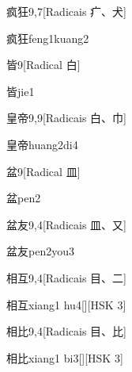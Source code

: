 \begin{entry}{疯狂}{9,7}[Radicais ⽧、⽝]
  \begin{phonetics}{疯狂}{feng1kuang2}
  \end{phonetics}
\end{entry}

\begin{entry}{皆}{9}[Radical ⽩]
  \begin{phonetics}{皆}{jie1}
  \end{phonetics}
\end{entry}

\begin{entry}{皇帝}{9,9}[Radicais ⽩、⼱]
  \begin{phonetics}{皇帝}{huang2di4}
  \end{phonetics}
\end{entry}

\begin{entry}{盆}{9}[Radical ⽫]
  \begin{phonetics}{盆}{pen2}
  \end{phonetics}
\end{entry}

\begin{entry}{盆友}{9,4}[Radicais ⽫、⼜]
  \begin{phonetics}{盆友}{pen2you3}
  \end{phonetics}
\end{entry}

\begin{entry}{相互}{9,4}[Radicais ⽬、⼆]
  \begin{phonetics}{相互}{xiang1 hu4}[][HSK 3]
  \end{phonetics}
\end{entry}

\begin{entry}{相比}{9,4}[Radicais ⽬、⽐]
  \begin{phonetics}{相比}{xiang1 bi3}[][HSK 3]
  \end{phonetics}
\end{entry}

